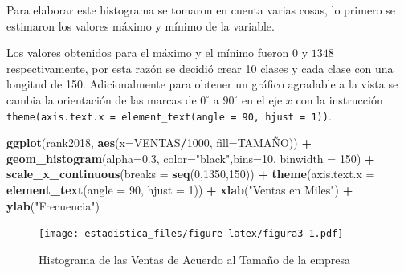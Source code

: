 \documentclass[]{book}
\newenvironment{Shaded}{\begin{snugshade}}{\end{snugshade}}
\newcommand{\KeywordTok}[1]{\textcolor[rgb]{0.13,0.29,0.53}{\textbf{#1}}}
\newcommand{\DataTypeTok}[1]{\textcolor[rgb]{0.13,0.29,0.53}{#1}}
\newcommand{\DecValTok}[1]{\textcolor[rgb]{0.00,0.00,0.81}{#1}}
\newcommand{\FloatTok}[1]{\textcolor[rgb]{0.00,0.00,0.81}{#1}}
\newcommand{\StringTok}[1]{\textcolor[rgb]{0.31,0.60,0.02}{#1}}
\newcommand{\OperatorTok}[1]{\textcolor[rgb]{0.81,0.36,0.00}{\textbf{#1}}}
\newcommand{\NormalTok}[1]{#1}
\begin{document}
Para elaborar este histograma se tomaron en cuenta varias cosas, lo
primero se estimaron los valores máximo y mínimo de la variable.

\begin{Shaded}
\end{Shaded}

Los valores obtenidos para el máximo y el mínimo fueron \(0\) y \(1348\)
respectivamente, por esta razón se decidió crear 10 clases y cada clase
con una longitud de 150. Adicionalmente para obtener un gráfico
agradable a la vista se cambia la orientación de las marcas de
\(0^\circ\) a \(90^\circ\) en el eje \(x\) con la instrucción
\texttt{theme(axis.text.x\ =\ element\_text(angle\ =\ 90,\ hjust\ =\ 1))}.

\begin{Shaded}
\begin{Highlighting}[]
\KeywordTok{ggplot}\NormalTok{(rank2018, }\KeywordTok{aes}\NormalTok{(}\DataTypeTok{x=}\NormalTok{VENTAS}\OperatorTok{/}\DecValTok{1000}\NormalTok{, }\DataTypeTok{fill=}\NormalTok{TAMAÑO)) }\OperatorTok{+}\StringTok{ }
\StringTok{  }\KeywordTok{geom_histogram}\NormalTok{(}\DataTypeTok{alpha=}\FloatTok{0.3}\NormalTok{, }\DataTypeTok{color=}\StringTok{"black"}\NormalTok{,}\DataTypeTok{bins=}\DecValTok{10}\NormalTok{, }\DataTypeTok{binwidth =} \DecValTok{150}\NormalTok{) }\OperatorTok{+}
\StringTok{  }\KeywordTok{scale_x_continuous}\NormalTok{(}\DataTypeTok{breaks =} \KeywordTok{seq}\NormalTok{(}\DecValTok{0}\NormalTok{,}\DecValTok{1350}\NormalTok{,}\DecValTok{150}\NormalTok{)) }\OperatorTok{+}
\StringTok{  }\KeywordTok{theme}\NormalTok{(}\DataTypeTok{axis.text.x =} \KeywordTok{element_text}\NormalTok{(}\DataTypeTok{angle =} \DecValTok{90}\NormalTok{, }\DataTypeTok{hjust =} \DecValTok{1}\NormalTok{)) }\OperatorTok{+}
\StringTok{  }\KeywordTok{xlab}\NormalTok{(}\StringTok{"Ventas en Miles"}\NormalTok{) }\OperatorTok{+}\StringTok{ }\KeywordTok{ylab}\NormalTok{(}\StringTok{"Frecuencia"}\NormalTok{) }
\end{Highlighting}
\end{Shaded}

\begin{figure}
\centering
\texttt{[image: estadistica\_files/figure-latex/figura3-1.pdf]}
\caption{\label{fig:figura3}Histograma de las Ventas de Acuerdo al Tamaño de
la empresa}
\end{figure}
\end{document}
